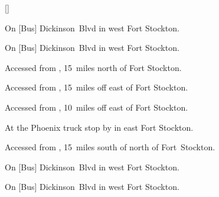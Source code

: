 
[]

\begin{LocationList}

On [Bus] Dickinson~Blvd in west Fort Stockton.

\Location{\GarageHQ \Garage}
On [Bus] Dickinson~Blvd in west Fort Stockton.

Accessed from , 15~miles north of Fort Stockton.

Accessed from , 15~miles off  east of Fort Stockton.

Accessed from , 10~miles off  east of Fort Stockton.

At the Phoenix truck stop by   in east Fort Stockton.

Accessed from , 15~miles south of  north of Fort~Stockton.

On [Bus] Dickinson~Blvd in west Fort Stockton.

On [Bus] Dickinson~Blvd in west Fort Stockton.

\end{LocationList}
